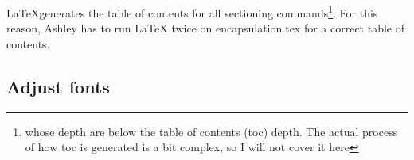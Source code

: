 \documentclass[oneside]{book}
\begin{document}
\LaTeX generates the table of contents for all sectioning commands\footnote{whose depth are below the table of contents (toc) depth. The actual process of how toc is generated is a bit complex, so I will not cover it here}. For this reason, Ashley has to run \LaTeX{} twice on encapsulation.tex for a correct table of contents.

\subsection{Adjust fonts}
\end{document}
